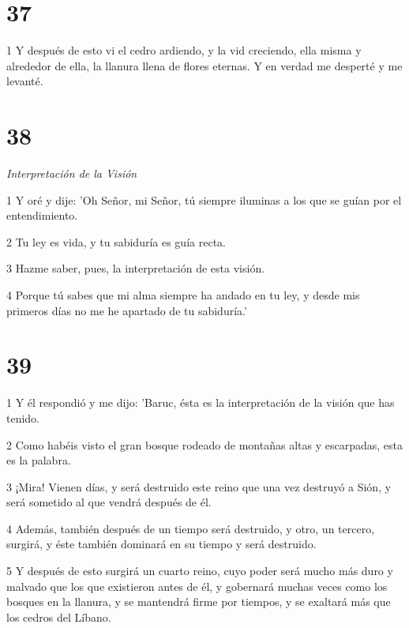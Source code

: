\chapter{37}

\par 1 Y después de esto vi el cedro ardiendo, y la vid creciendo, ella misma y alrededor de ella, la llanura llena de flores eternas. Y en verdad me desperté y me levanté.

\chapter{38}

\par \textit{Interpretación de la Visión}

\par 1 Y oré y dije: 'Oh Señor, mi Señor, tú siempre iluminas a los que se guían por el entendimiento.

\par 2 Tu ley es vida, y tu sabiduría es guía recta.

\par 3 Hazme saber, pues, la interpretación de esta visión.

\par 4 Porque tú sabes que mi alma siempre ha andado en tu ley, y desde mis primeros días no me he apartado de tu sabiduría.'

\chapter{39}

\par 1 Y él respondió y me dijo: 'Baruc, ésta es la interpretación de la visión que has tenido.

\par 2 Como habéis visto el gran bosque rodeado de montañas altas y escarpadas, esta es la palabra.

\par 3 ¡Mira! Vienen días, y será destruido este reino que una vez destruyó a Sión, y será sometido al que vendrá después de él.

\par 4 Además, también después de un tiempo será destruido, y otro, un tercero, surgirá, y éste también dominará en su tiempo y será destruido.

\par 5 Y después de esto surgirá un cuarto reino, cuyo poder será mucho más duro y malvado que los que existieron antes de él, y gobernará muchas veces como los bosques en la llanura, y se mantendrá firme por tiempos, y se exaltará más que los cedros del Líbano.

